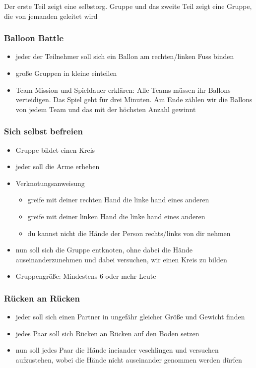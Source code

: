 Der erste Teil zeigt eine selbstorg. Gruppe und das zweite Teil zeigt eine
Gruppe, die von jemanden geleitet wird


\subsubsection{Balloon Battle}
\begin{itemize}
  \item jeder der Teilnehmer soll sich ein Ballon am rechten/linken Fuss binden
  \item große Gruppen in kleine einteilen
  \item Team Mission und Spieldauer erklären: Alle Teams müssen ihr Ballons verteidigen.
    Das Spiel geht für drei Minuten. Am Ende zählen wir die Ballons von jedem Team und das
    mit der höchsten Anzahl gewinnt
\end{itemize}


\subsubsection{Sich selbst befreien}
\begin{itemize}
  \item Gruppe bildet einen Kreis
  \item jeder soll die Arme erheben
  \item Verknotungsanweisung
    \begin{itemize}
      \item greife mit deiner rechten Hand die linke hand eines anderen
      \item greife mit deiner linken Hand die linke hand eines anderen
      \item du kannst nicht die Hände der Person rechts/links von dir nehmen
    \end{itemize}
  \item nun soll sich die Gruppe entknoten, ohne dabei
    die Hände auseinanderzunehmen und dabei versuchen,
    wir einen Kreis zu bilden
  \item Gruppengröße: Mindestens 6 oder mehr Leute
\end{itemize}


\subsubsection{Rücken an Rücken}
\begin{itemize}
  \item jeder soll sich einen Partner in ungefähr gleicher Größe und Gewicht finden
  \item jedes Paar soll sich Rücken an Rücken auf den Boden setzen
  \item nun soll jedes Paar die Hände ineiander veschlingen und versuchen aufzustehen,
    wobei die Hände nicht auseinander genommen werden dürfen
\end{itemize}


